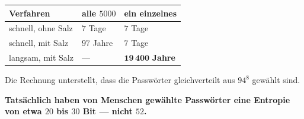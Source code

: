 \begin{aufgabe}
\begin{center}
{\small
\renewcommand{\arraystretch}{1.48}
\begin{tabular}{@{}P{2.6cm}P{2.4cm}P{2.6cm}@{}}
\toprule
\textbf{Verfahren} & \textbf{alle $5000$} & \textbf{ein einzelnes}\\
\midrule
schnell, ohne Salz & $7$ Tage & $7$ Tage\\
schnell, mit Salz & $97$ Jahre & $7$ Tage\\
langsam, mit Salz & --- & $\mathbf{19\,400}$ \textbf{Jahre}\\
\bottomrule
\end{tabular}}
\end{center}

Die Rechnung unterstellt, dass die Passwörter gleichverteilt aus $94^{8}$ gewählt sind.

\begin{center}
\begin{minipage}{0.9\textwidth}
\textbf{Tatsächlich haben von Menschen gewählte Passwörter eine Entropie von etwa $20$ bis $30$ Bit --- nicht $52$.}
\end{minipage}
\end{center}

\begin{center}
\begin{minipage}{0.88\textwidth}
\end{minipage}
\end{center}
\end{aufgabe}

